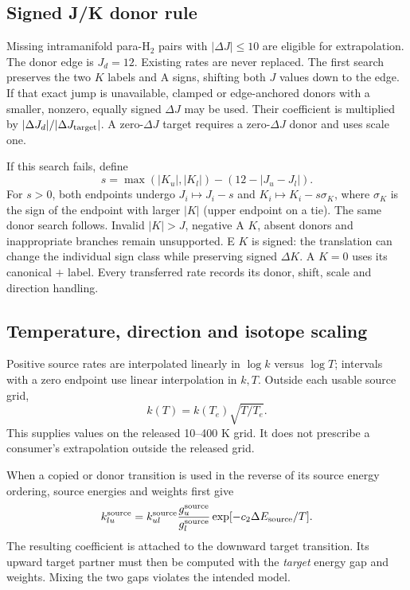 \documentclass[11pt,a4paper]{article}
\begin{document}
\subsection{Signed J/K donor rule}
Missing intramanifold para-H$_2$ pairs with $|\Delta J|\le10$ are eligible
for extrapolation. The donor edge is $J_d=12$. Existing rates are never
replaced. The first search preserves the two $K$ labels and A signs, shifting
both $J$ values down to the edge. If that exact jump is unavailable, clamped
or edge-anchored donors with a smaller, nonzero, equally signed $\Delta J$
may be used. Their coefficient is multiplied by
$|\Delta J_d|/|\Delta J_{\rm target}|$. A zero-$\Delta J$ target requires
a zero-$\Delta J$ donor and uses scale one.

If this search fails, define
\begin{equation}
s=\max(|K_u|,|K_l|)-(12-|J_u-J_l|).
\end{equation}
For $s>0$, both endpoints undergo
$J_i\mapsto J_i-s$ and $K_i\mapsto K_i-s\sigma_K$, where $\sigma_K$
is the sign of the endpoint with larger $|K|$ (upper endpoint on a tie).
The same donor search follows. Invalid $|K|>J$, negative A $K$, absent
donors and inappropriate branches remain unsupported. E $K$ is signed:
the translation can change the individual sign class while preserving signed
$\Delta K$. A $K=0$ uses its canonical $+$ label. Every transferred rate
records its donor, shift, scale and direction handling.

\subsection{Temperature, direction and isotope scaling}
Positive source rates are interpolated linearly in $\log k$ versus
$\log T$; intervals with a zero endpoint use linear interpolation in $k,T$.
Outside each usable source grid,
\begin{equation}
k(T)=k(T_e)\sqrt{T/T_e}.
\end{equation}
This supplies values on the released 10--400 K grid. It does not prescribe
a consumer's extrapolation outside the released grid.

When a copied or donor transition is used in the reverse of its source
energy ordering, source energies and weights first give
\begin{equation}
k_{lu}^{\rm source}=k_{ul}^{\rm source}
\frac{g_u^{\rm source}}{g_l^{\rm source}}
\exp[-c_2\Delta E_{\rm source}/T].
\end{equation}
The resulting coefficient is attached to the downward target transition.
Its upward target partner must then be computed with the \emph{target}
energy gap and weights. Mixing the two gaps violates the intended model.
\end{document}
